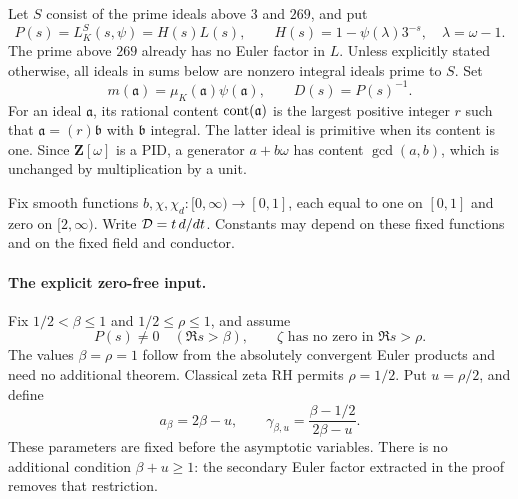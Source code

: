 Let \(S\) consist of the prime ideals above \(3\) and \(269\), and put
\begin{equation}
 P(s)=L_K^S(s,\psi)=H(s)L(s),\qquad
 H(s)=1-\psi(\lambda)3^{-s},\quad \lambda=\omega-1.
 \label{jct:incomplete}
\end{equation}
The prime above \(269\) already has no Euler factor in \(L\).
Unless explicitly stated otherwise, all ideals in sums below are
nonzero integral ideals prime to \(S\).
Set
\[
 m(\mathfrak a)=\mu_K(\mathfrak a)\psi(\mathfrak a),\qquad
 D(s)=P(s)^{-1}.
\]
For an ideal \(\mathfrak a\), its rational content
\(\operatorname{cont}(\mathfrak a)\) is the largest positive integer \(r\) such
that \(\mathfrak a=(r)\mathfrak b\) with \(\mathfrak b\) integral.
The latter ideal is primitive when its content is one.  Since
\(\mathbf Z[\omega]\) is a PID, a generator \(a+b\omega\) has
content \(\gcd(a,b)\), which is unchanged by multiplication by a unit.

Fix smooth functions \(b,\chi,\chi_d:[0,\infty)\to[0,1]\), each
equal to one on \([0,1]\) and zero on \([2,\infty)\).
Write \(\mathcal D=t\,d/dt\).  Constants may depend on these fixed
functions and on the fixed field and conductor.

\paragraph{The explicit zero-free input.}
Fix \(1/2<\beta\le1\) and \(1/2\le\rho\le1\), and assume
\begin{equation}
 P(s)\ne0\quad(\Re s>\beta),\qquad
 \zeta\text{ has no zero in }\Re s>\rho.
 \label{jct:zero-free-input}
\end{equation}
The values \(\beta=\rho=1\) follow from the absolutely convergent
Euler products and need no additional theorem. Classical zeta RH
permits \(\rho=1/2\). Put \(u=\rho/2\), and define
\begin{equation}
 a_\beta=2\beta-u,\qquad
 \gamma_{\beta,u}=\frac{\beta-1/2}{2\beta-u}.
 \label{jct:exponents}
\end{equation}
These parameters are fixed before the asymptotic variables.
There is no additional condition \(\beta+u\ge1\): the secondary
Euler factor extracted in the proof removes that restriction.

